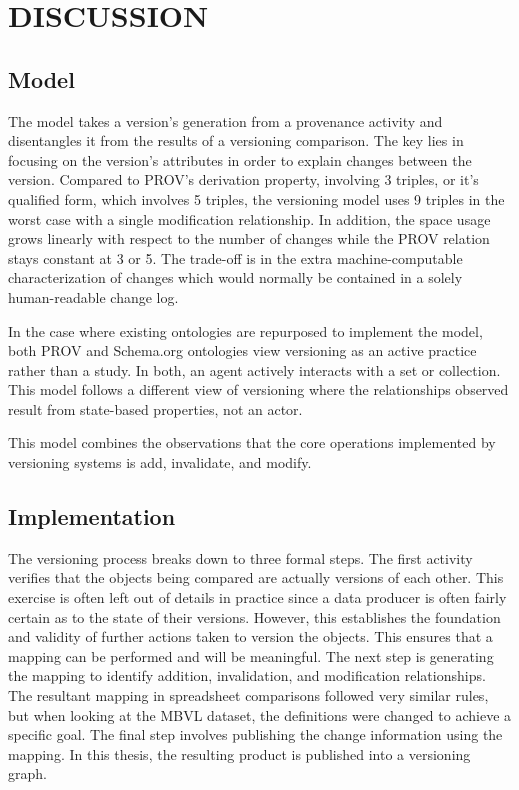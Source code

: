 
\chapter{DISCUSSION}

\section{Model}

The model takes a version's generation from a provenance activity and disentangles it from the results of a versioning comparison.
The key lies in focusing on the version's attributes in order to explain changes between the version.
Compared to PROV's derivation property, involving 3 triples, or it's qualified form, which involves 5 triples, the versioning model uses 9 triples in the worst case with a single modification relationship.
In addition, the space usage grows linearly with respect to the number of changes while the PROV relation stays constant at 3 or 5.
The trade-off is in the extra machine-computable characterization of changes which would normally be contained in a solely human-readable change log.

In the case where existing ontologies are repurposed to implement the model, both PROV and Schema.org ontologies view versioning as an active practice rather than a study.
In both, an agent actively interacts with a set or collection.
This model follows a different view of versioning where the relationships observed result from state-based properties, not an actor.

This model combines the observations that the core operations implemented by versioning systems is add, invalidate, and modify.

\section{Implementation}

The versioning process breaks down to three formal steps.
The first activity verifies that the objects being compared are actually versions of each other.
This exercise is often left out of details in practice since a data producer is often fairly certain as to the state of their versions.
However, this establishes the foundation and validity of further actions taken to version the objects.
This ensures that a mapping can be performed and will be meaningful.
The next step is generating the mapping to identify addition, invalidation, and modification relationships.
The resultant mapping in spreadsheet comparisons followed very similar rules, but when looking at the MBVL dataset, the definitions were changed to achieve a specific goal.
The final step involves publishing the change information using the mapping.
In this thesis, the resulting product is published into a versioning graph.

